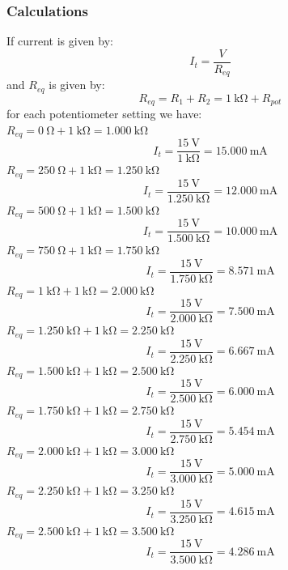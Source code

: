 \documentclass[a4paper]{article}
\begin{document}
\subsubsection{Calculations}
If current is given by:
\[I_t=\frac{V}{R_{eq}}\]
and $R_{eq}$ is given by:
   \[R_{eq}=R_1+R_2=\SI{1}{\kilo\ohm}+R_{pot}\]
for each potentiometer setting we have:\\
$R_{eq}=\SI{0}{\ohm}+\SI{1}{\kilo\ohm}=\SI{1.000}{\kilo\ohm}$
\[I_t=\frac{\SI{15}{\volt}}{\SI{1}{\kilo\ohm}}
=\SI{15.000}{\milli\ampere}\]
$R_{eq}=\SI{250}{\ohm}+\SI{1}{\kilo\ohm}=\SI{1.250}{\kilo\ohm}$
\[I_t=\frac{\SI{15}{\volt}}{\SI{1.250}{\kilo\ohm}}
=\SI{12.000}{\milli\ampere}\]
$R_{eq}=\SI{500}{\ohm}+\SI{1}{\kilo\ohm}=\SI{1.500}{\kilo\ohm}$
\[I_t=\frac{\SI{15}{\volt}}{\SI{1.500}{\kilo\ohm}}
=\SI{10.000}{\milli\ampere}\]
$R_{eq}=\SI{750}{\ohm}+\SI{1}{\kilo\ohm}=\SI{1.750}{\kilo\ohm}$
\[I_t=\frac{\SI{15}{\volt}}{\SI{1.750}{\kilo\ohm}}
=\SI{8.571}{\milli\ampere}\]
$R_{eq}=\SI{1}{\kilo\ohm}+\SI{1}{\kilo\ohm}=\SI{2.000}{\kilo\ohm}$
\[I_t=\frac{\SI{15}{\volt}}{\SI{2.000}{\kilo\ohm}}
=\SI{7.500}{\milli\ampere}\]
$R_{eq}=\SI{1.250}{\kilo\ohm}+\SI{1}{\kilo\ohm}=\SI{2.250}{\kilo\ohm}$
\[I_t=\frac{\SI{15}{\volt}}{\SI{2.250}{\kilo\ohm}}
=\SI{6.667}{\milli\ampere}\]
$R_{eq}=\SI{1.500}{\kilo\ohm}+\SI{1}{\kilo\ohm}=\SI{2.500}{\kilo\ohm}$
\[I_t=\frac{\SI{15}{\volt}}{\SI{2.500}{\kilo\ohm}}
=\SI{6.000}{\milli\ampere}\]
$R_{eq}=\SI{1.750}{\kilo\ohm}+\SI{1}{\kilo\ohm}=\SI{2.750}{\kilo\ohm}$
\[I_t=\frac{\SI{15}{\volt}}{\SI{2.750}{\kilo\ohm}}
=\SI{5.454}{\milli\ampere}\]
$R_{eq}=\SI{2.000}{\kilo\ohm}+\SI{1}{\kilo\ohm}=\SI{3.000}{\kilo\ohm}$
\[I_t=\frac{\SI{15}{\volt}}{\SI{3.000}{\kilo\ohm}}
=\SI{5.000}{\milli\ampere}\]
$R_{eq}=\SI{2.250}{\kilo\ohm}+\SI{1}{\kilo\ohm}=\SI{3.250}{\kilo\ohm}$
\[I_t=\frac{\SI{15}{\volt}}{\SI{3.250}{\kilo\ohm}}
=\SI{4.615}{\milli\ampere}\]
$R_{eq}=\SI{2.500}{\kilo\ohm}+\SI{1}{\kilo\ohm}=\SI{3.500}{\kilo\ohm}$
\[I_t=\frac{\SI{15}{\volt}}{\SI{3.500}{\kilo\ohm}}
=\SI{4.286}{\milli\ampere}\]
\end{document}
